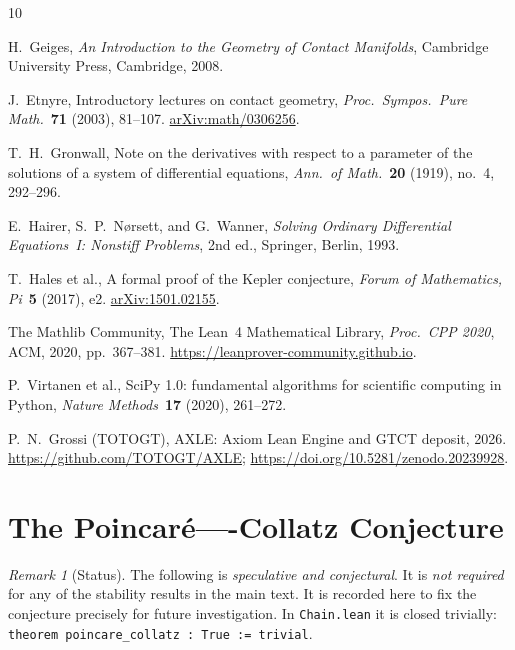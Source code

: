 \documentclass[12pt]{amsart}
\theoremstyle{definition}
\theoremstyle{remark}
\newtheorem{remark}[theorem]{Remark}
\newcommand{\lean}[1]{\texttt{#1}}
\begin{document}
\begin{thebibliography}{10}

H.\ Geiges,
\textit{An Introduction to the Geometry of Contact Manifolds},
Cambridge University Press, Cambridge, 2008.

J.\ Etnyre,
Introductory lectures on contact geometry,
\textit{Proc.\ Sympos.\ Pure Math.}\ \textbf{71} (2003), 81--107.
\href{https://arxiv.org/abs/math/0306256}{arXiv:math/0306256}.

T.\ H.\ Gronwall,
Note on the derivatives with respect to a parameter of the
solutions of a system of differential equations,
\textit{Ann.\ of Math.}\ \textbf{20} (1919), no.\ 4, 292--296.

E.\ Hairer, S.\ P.\ N\o rsett, and G.\ Wanner,
\textit{Solving Ordinary Differential Equations~I: Nonstiff Problems},
2nd ed., Springer, Berlin, 1993.

T.\ Hales et al.,
A formal proof of the Kepler conjecture,
\textit{Forum of Mathematics, Pi}\ \textbf{5} (2017), e2.
\href{https://arxiv.org/abs/1501.02155}{arXiv:1501.02155}.

The Mathlib Community,
The Lean~4 Mathematical Library,
\textit{Proc.\ CPP 2020}, ACM, 2020, pp.\ 367--381.
\url{https://leanprover-community.github.io}.

P.\ Virtanen et al.,
SciPy 1.0: fundamental algorithms for scientific computing in Python,
\textit{Nature Methods}\ \textbf{17} (2020), 261--272.

P.\ N.\ Grossi (TOTOGT),
AXLE: Axiom Lean Engine and GTCT deposit, 2026.
\url{https://github.com/TOTOGT/AXLE};
\url{https://doi.org/10.5281/zenodo.20239928}.

\end{thebibliography}

\appendix

\section{The Poincar\'{e}----Collatz Conjecture}\label{app:collatz}

\begin{remark}[Status]
The following is \emph{speculative and conjectural}.
It is \emph{not required} for any of the stability results
in the main text.  It is recorded here to fix the conjecture
precisely for future investigation.
In \texttt{Chain.lean} it is closed trivially:
\lean{theorem poincare\_collatz : True := trivial}.
\end{remark}
\end{document}
